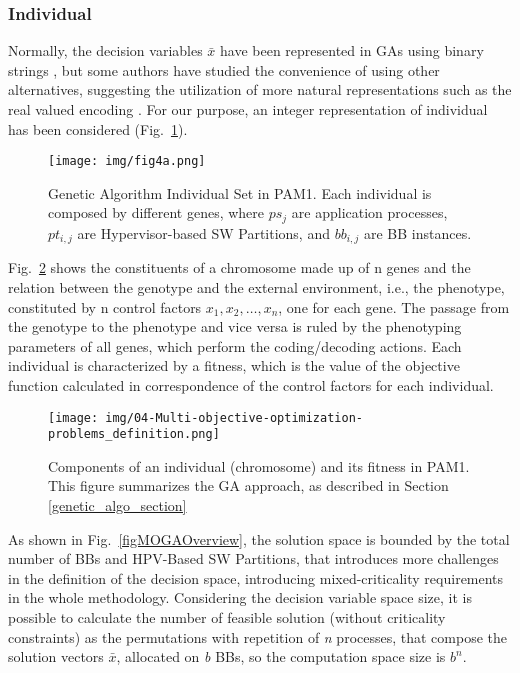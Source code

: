 \subsubsection{Individual}\label{ind_PAM1}

Normally, the decision variables $\bar x$ have been represented in GAs using binary strings \cite{bibgenetic18}, but some authors have studied the convenience of using other alternatives, suggesting the utilization of more natural representations such as the real valued encoding \cite{bibgenetic18}. For our purpose, an integer representation of individual has been considered (Fig.~\ref{fig3_001}). \par
%
\begin{figure}[htbp!]
	\centerline{\texttt{[image: img/fig4a.png]}}
	\caption{Genetic Algorithm Individual Set in PAM1. Each individual is composed by different genes, where $ps_j$ are application processes, $pt_{i,j}$ are Hypervisor-based SW Partitions, and $bb_{i,j}$ are BB instances.}
	\label{fig3_001}
\end{figure}
%
Fig.~\ref{figMOGADef} shows the constituents of a chromosome made up of n genes and the relation between the genotype and the external environment, i.e., the phenotype, constituted by n control factors $x_1, x_2, \ldots , x_n$, one for each gene. The passage from the genotype to the phenotype and vice versa is ruled by the phenotyping parameters of all genes, which perform the coding/decoding actions. Each individual is characterized by a fitness, which is the value of the objective function calculated in correspondence of the control factors for each individual. \par
%
\begin{figure}[htbp]
	\centerline{\texttt{[image: img/04-Multi-objective-optimization-problems\_definition.png]}}
	\caption{Components of an individual (chromosome) and its fitness in PAM1. This figure summarizes the GA approach, as described in Section \ref{genetic_algo_section}}
	\label{figMOGADef}
\end{figure}
%
As shown in Fig.~\ref{figMOGAOverview}, the solution space is bounded by the total number of BBs and HPV-Based SW Partitions, that introduces more challenges in the definition of the decision space, introducing mixed-criticality requirements in the whole methodology. Considering the decision variable space size, it is possible to calculate the number of feasible solution (without criticality constraints) as the permutations with repetition of \textit{n} processes, that compose the solution vectors $\bar x$, allocated on \textit{b} BBs, so the computation space size is $b^n$. \par
